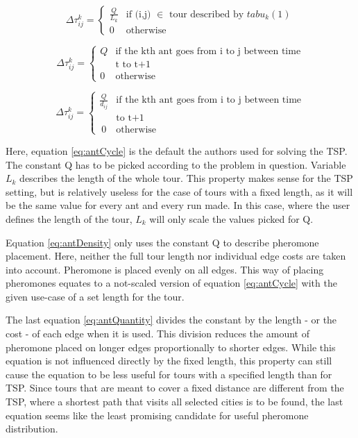 \begin{equation}\label{eq:antCycle}
	\Delta\tau_{ij}^k = \begin{cases}
			\frac{Q}{L_k} &\text{if (i,j) $\in$ tour described by $tabu_k(1)$} \\
			0 &\text{otherwise}
	\end{cases}	
\end{equation}


\begin{equation}\label{eq:antDensity}
	\Delta\tau_{ij}^k = \begin{cases}
	Q &\text{if the kth ant goes from i to j between time} \\
	&\text{t to t+1} \\
	0 &\text{otherwise}
\end{cases}	
\end{equation}


\begin{equation}\label{eq:antQuantity}
	\Delta\tau_{ij}^k = \begin{cases}
	\frac{Q}{d_{ij}} &\text{if the kth ant goes from i to j between time} \\
		&\text{to t+1} \\\
	0 &\text{otherwise}
\end{cases}	
\end{equation}

Here, equation \ref{eq:antCycle} is the default the authors used for solving the TSP.
The constant Q has to be picked according to the problem in question.
Variable $L_k$ describes the length of the whole tour.
This property makes sense for the TSP setting, but is relatively useless for the case of tours with a fixed length, as it will be the same value for every ant and every run made.
In this case, where the user defines the length of the tour, $L_k$ will only scale the values picked for Q.

Equation \ref{eq:antDensity} only uses the constant Q to describe pheromone placement. 
Here, neither the full tour length nor individual edge costs are taken into account. 
Pheromone is placed evenly on all edges.
This way of placing pheromones equates to a not-scaled version of equation \ref{eq:antCycle} with the given use-case of a set length for the tour.

The last equation \ref{eq:antQuantity} divides the constant by the length - or the cost - of each edge when it is used. 
This division reduces the amount of pheromone placed on longer edges proportionally to shorter edges. 
While this equation is not influenced directly by the fixed length, this property can still cause the equation to be less useful for tours with a specified length than for TSP.
Since tours that are meant to cover a fixed distance are different from the TSP, where a shortest path that visits all selected cities is to be found, the last equation seems like the least promising candidate for useful pheromone distribution.

